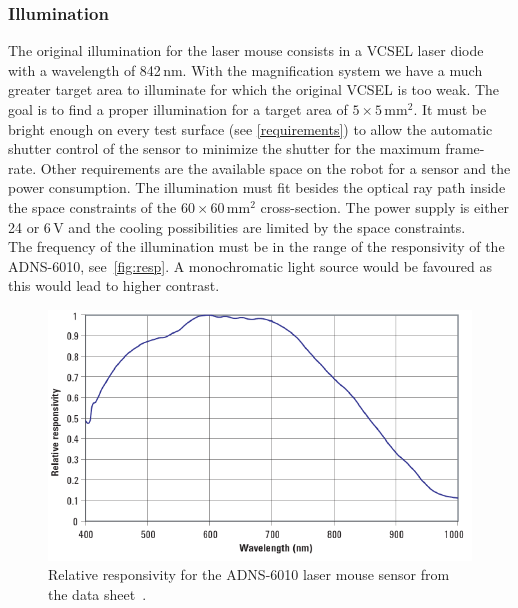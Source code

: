 \documentclass[12pt,a4paper]{article}
\begin{document}
\subsubsection{Illumination}

The original illumination for the laser mouse consists in a VCSEL laser diode with a wavelength of 842\,nm.
With the magnification system we have a much greater target area to illuminate for which the original VCSEL is too weak.
The goal is to find a proper illumination for a target area of $5\times5$\,mm$^2$.
It must be bright enough on every test surface (see \autoref{requirements}) to allow the automatic shutter control of the sensor to minimize the shutter for the maximum frame-rate. 
Other requirements are the available space on the robot for a sensor and the power consumption. 
The illumination must fit besides the optical ray path inside the space constraints of the $60\times60$\,mm$^2$ cross-section.
The power supply is either 24 or 6\,V and the cooling possibilities are limited by the space constraints.\\
The frequency of the illumination must be in the range of the responsivity of the ADNS-6010, see~\autoref{fig:resp}.
A monochromatic light source would be favoured as this would lead to higher contrast.

\begin{figure}[htbp]
\begin{center}
\includegraphics[width=0.6\columnwidth]{figures/responsivity}
\caption{\label{fig:resp}
Relative responsivity for the ADNS-6010 laser mouse sensor from the data sheet~\cite{adns}.
}
\end{center}
\end{figure}
\end{document}

